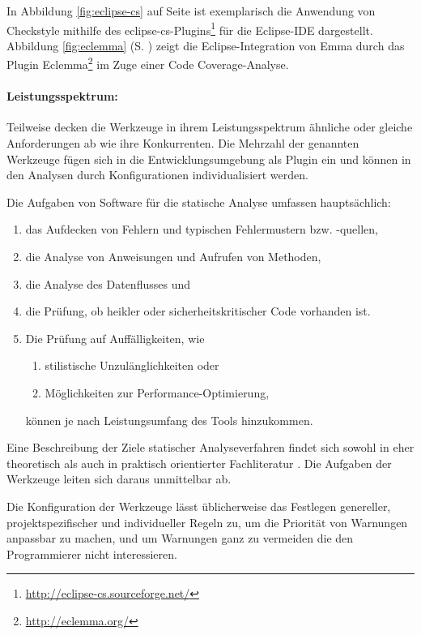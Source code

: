 In Abbildung \ref{fig:eclipse-cs} auf Seite \pageref{fig:eclipse-cs} ist exemplarisch die Anwendung von Checkstyle mithilfe des eclipse-cs-Plugins\footnote{\url{http://eclipse-cs.sourceforge.net/}} für die Eclipse-IDE dargestellt. Abbildung \ref{fig:eclemma} (S. \pageref{fig:eclemma}) zeigt die Eclipse-Integration von Emma durch das Plugin Eclemma\footnote{\url{http://eclemma.org/}} im Zuge einer Code Coverage-Analyse.


\paragraph{Leistungsspektrum:} Teilweise decken die Werkzeuge in ihrem Leistungsspektrum ähnliche oder gleiche Anforderungen ab wie ihre Konkurrenten. Die Mehrzahl der genannten Werkzeuge fügen sich in die Entwicklungsumgebung als Plugin ein und können in den Analysen durch Konfigurationen individualisiert werden. 

Die Aufgaben von Software für die statische Analyse umfassen hauptsächlich:
\begin{enumerate}
\item das Aufdecken von Fehlern und typischen Fehlermustern bzw. -quellen,
\item die Analyse von Anweisungen und Aufrufen von Methoden,
\item die Analyse des Datenflusses und
\item die Prüfung, ob heikler oder sicherheitskritischer Code vorhanden ist. 
\item Die Prüfung auf Auffälligkeiten, wie \begin{enumerate}
\item stilistische Unzulänglichkeiten oder
\item Möglichkeiten zur Performance-Optimierung,
\end{enumerate} können je nach Leistungsumfang des Tools hinzukommen.
\end{enumerate}

Eine Beschreibung der Ziele statischer Analyseverfahren findet sich sowohl in eher theoretisch \citep[S. 270]{liggesmeyer2009} als auch in praktisch orientierter Fachliteratur \citep[S. 98]{linz2010}. Die Aufgaben der Werkzeuge leiten sich daraus unmittelbar ab.

Die Konfiguration der Werkzeuge lässt üblicherweise das Festlegen genereller, projektspezifischer und individueller Regeln zu, um die Priorität von Warnungen anpassbar zu machen, und um Warnungen ganz zu vermeiden die den Programmierer nicht interessieren.

